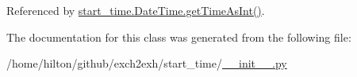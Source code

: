 Referenced by \hyperlink{start__time_2____init_____8py_source_l00028}{start\+\_\+time.\+Date\+Time.\+get\+Time\+As\+Int()}.



The documentation for this class was generated from the following file\+:\begin{DoxyCompactItemize}
\item 
/home/hilton/github/exch2exh/start\+\_\+time/\hyperlink{start__time_2____init_____8py}{\+\_\+\+\_\+init\+\_\+\+\_\+.\+py}\end{DoxyCompactItemize}
